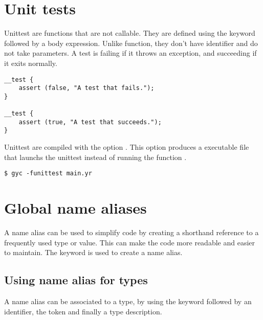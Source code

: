 

\section{Unit tests}%
\label{sec:unit_test}

Unittest are functions that are not callable. They are defined using the keyword
 followed by a body expression. Unlike function, they don't
have identifier and do not take parameters. A test is failing if it throws an
exception, and succeeding if it exits normally.

\begin{lstlisting}[style=coloredverbatim]
__test {
    assert (false, "A test that fails.");
}

__test {
    assert (true, "A test that succeeds.");
}
\end{lstlisting}


Unittest are compiled with the option . This option produces
a executable file that launchs the unittest instead of running the function
.

\begin{lstlisting}[style=intermediateVerb]
$ gyc -funittest main.yr
\end{lstlisting}

\section{Global name aliases}
\label{sec:global_alias_names}


A name alias can be used to simplify code by creating a shorthand reference to a
frequently used type or value. This can make the code more readable and easier
to maintain. The keyword  is used to create a name alias.

\subsection {Using name alias for types}

A name alias can be associated to a type, by using the keyword 
followed by an identifier, the token \token{=} and finally a type description.

